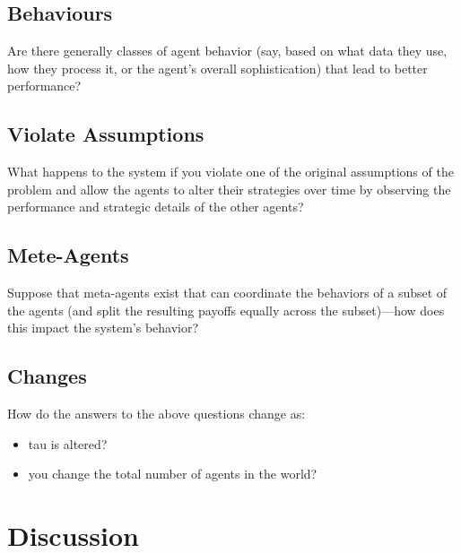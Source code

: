 \documentclass[]{article}
\begin{document}
\subsection{Behaviours}Are there generally classes of agent behavior (say, based on what data they use, how they process it, or the agent's overall sophistication) that lead to better performance?
\subsection{Violate Assumptions}What happens to the system if you violate one of the original assumptions of the problem and allow the agents to alter their strategies over time by observing the performance and strategic details of the other agents?
\subsection{Mete-Agents}Suppose that meta-agents exist that can coordinate the behaviors of a subset of the agents (and split the resulting payoffs equally across the subset)---how does this impact the system's behavior?
\subsection{Changes}How do the answers to the above questions change as:
\begin{itemize}
	\item tau is altered?
	\item you change the total number of agents in the world?
\end{itemize}

\section{Discussion}

\medskip



\end{document}
